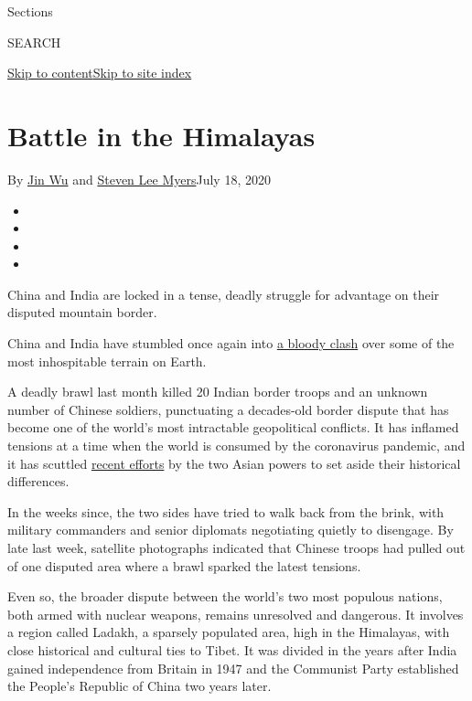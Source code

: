 Sections

SEARCH

\protect\hyperlink{site-content}{Skip to
content}\protect\hyperlink{site-index}{Skip to site index}

\hypertarget{battle-in-the-himalayas}{%
\section{Battle in the Himalayas}\label{battle-in-the-himalayas}}

By \href{https://www.nytimes3xbfgragh.onion/by/jin-wu}{Jin Wu} and
\href{https://www.nytimes3xbfgragh.onion/by/steven-lee-myers}{Steven Lee
Myers}July 18, 2020

\begin{itemize}
\item
\item
\item
\item
\end{itemize}

China and India are locked in a tense, deadly struggle for advantage on
their disputed mountain border.

China and India have stumbled once again into
\href{https://www.nytimes3xbfgragh.onion/2020/06/16/world/asia/indian-china-border-clash.html}{a
bloody clash} over some of the most inhospitable terrain on Earth.

A deadly brawl last month killed 20 Indian border troops and an unknown
number of Chinese soldiers, punctuating a decades-old border dispute
that has become one of the world's most intractable geopolitical
conflicts. It has inflamed tensions at a time when the world is consumed
by the coronavirus pandemic, and it has scuttled
\href{https://www.nytimes3xbfgragh.onion/2019/10/11/world/asia/narendra-modi-xi-jinping-india-china.html}{recent
efforts} by the two Asian powers to set aside their historical
differences.

In the weeks since, the two sides have tried to walk back from the
brink, with military commanders and senior diplomats negotiating quietly
to disengage. By late last week, satellite photographs indicated that
Chinese troops had pulled out of one disputed area where a brawl sparked
the latest tensions.

Even so, the broader dispute between the world's two most populous
nations, both armed with nuclear weapons, remains unresolved and
dangerous. It involves a region called Ladakh, a sparsely populated
area, high in the Himalayas, with close historical and cultural ties to
Tibet. It was divided in the years after India gained independence from
Britain in 1947 and the Communist Party established the People's
Republic of China two years later.

